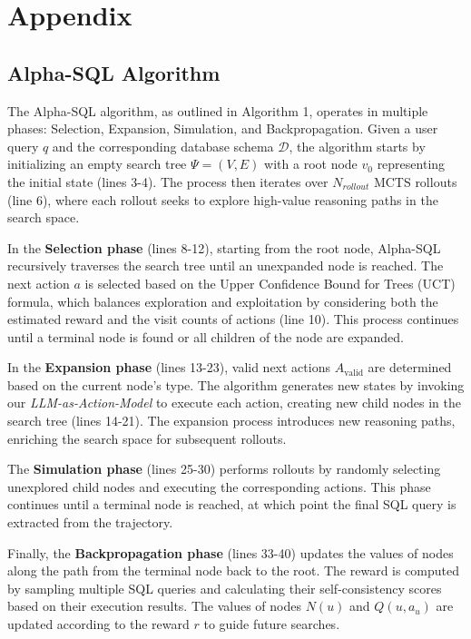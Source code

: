 \section{Appendix}
\label{sec:appendix}

\subsection{Alpha-SQL Algorithm}
\label{app:code}

The Alpha-SQL algorithm, as outlined in Algorithm 1, operates in multiple phases: Selection, Expansion, Simulation, and Backpropagation.
Given a user query $q$ and the corresponding database schema $\mathcal{D}$, the algorithm starts by initializing an empty search tree $\Psi = (V, E)$ with a root node $v_0$ representing the initial state (lines 3-4). The process then iterates over $N_{rollout}$ MCTS rollouts (line 6), where each rollout seeks to explore high-value reasoning paths in the search space.

In the \textbf{Selection phase} (lines 8-12), starting from the root node, Alpha-SQL recursively traverses the search tree until an unexpanded node is reached. The next action $a$ is selected based on the Upper Confidence Bound for Trees (UCT) formula, which balances exploration and exploitation by considering both the estimated reward and the visit counts of actions (line 10). This process continues until a terminal node is found or all children of the node are expanded.

In the \textbf{Expansion phase} (lines 13-23), valid next actions $A_{\text{valid}}$ are determined based on the current node's type. The algorithm generates new states by invoking our \textit{LLM-as-Action-Model} to execute each action, creating new child nodes in the search tree (lines 14-21). The expansion process introduces new reasoning paths, enriching the search space for subsequent rollouts.

The \textbf{Simulation phase} (lines 25-30) performs rollouts by randomly selecting unexplored child nodes and executing the corresponding actions. This phase continues until a terminal node is reached, at which point the final SQL query is extracted from the trajectory.

Finally, the \textbf{Backpropagation phase} (lines 33-40) updates the values of nodes along the path from the terminal node back to the root. The reward is computed by sampling multiple SQL queries and calculating their self-consistency scores based on their execution results. The values of nodes $N(u)$ and $Q(u, a_u)$ are updated according to the reward $r$ to guide future searches.

